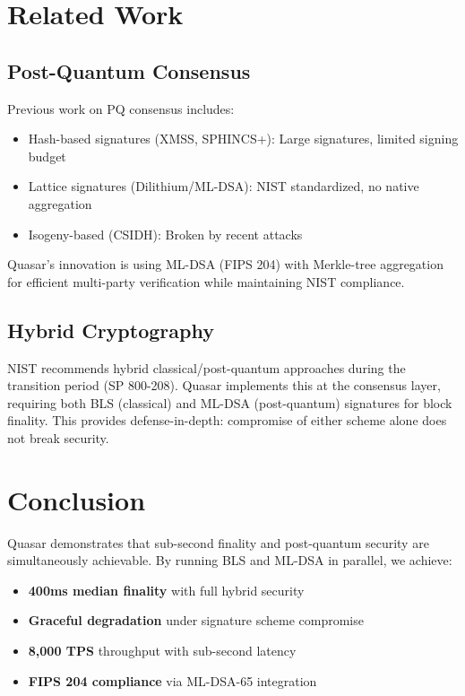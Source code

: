 \documentclass[11pt,a4paper]{article}
\begin{document}
\section{Related Work}

\subsection{Post-Quantum Consensus}

Previous work on PQ consensus includes:
\begin{itemize}
    \item Hash-based signatures (XMSS, SPHINCS+): Large signatures, limited signing budget
    \item Lattice signatures (Dilithium/ML-DSA): NIST standardized, no native aggregation
    \item Isogeny-based (CSIDH): Broken by recent attacks
\end{itemize}

Quasar's innovation is using ML-DSA (FIPS 204) with Merkle-tree aggregation for efficient multi-party verification while maintaining NIST compliance.

\subsection{Hybrid Cryptography}

NIST recommends hybrid classical/post-quantum approaches during the transition period (SP 800-208). Quasar implements this at the consensus layer, requiring both BLS (classical) and ML-DSA (post-quantum) signatures for block finality. This provides defense-in-depth: compromise of either scheme alone does not break security.

\section{Conclusion}

Quasar demonstrates that sub-second finality and post-quantum security are simultaneously achievable. By running BLS and ML-DSA in parallel, we achieve:

\begin{itemize}
    \item \textbf{400ms median finality} with full hybrid security
    \item \textbf{Graceful degradation} under signature scheme compromise
    \item \textbf{8,000 TPS} throughput with sub-second latency
    \item \textbf{FIPS 204 compliance} via ML-DSA-65 integration
\end{itemize}
\end{document}
